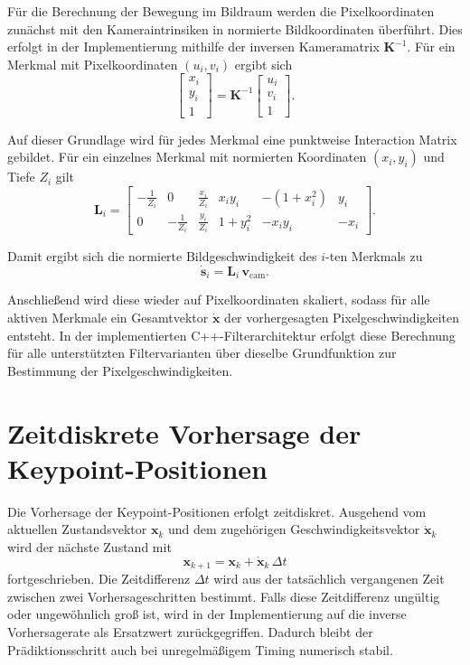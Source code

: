 Für die Berechnung der Bewegung im Bildraum werden die Pixelkoordinaten zunächst mit den Kameraintrinsiken in normierte Bildkoordinaten überführt. Dies erfolgt in der Implementierung mithilfe der inversen Kameramatrix \(\mathbf{K}^{-1}\). Für ein Merkmal mit Pixelkoordinaten \((u_i,v_i)\) ergibt sich
\begin{equation}
\begin{bmatrix}
x_i \\ y_i \\ 1
\end{bmatrix}
=
\mathbf{K}^{-1}
\begin{bmatrix}
u_i \\ v_i \\ 1
\end{bmatrix}.
\end{equation}

Auf dieser Grundlage wird für jedes Merkmal eine punktweise Interaction Matrix gebildet. Für ein einzelnes Merkmal mit normierten Koordinaten \((x_i,y_i)\) und Tiefe \(Z_i\) gilt
\begin{equation}
\mathbf{L}_i =
\begin{bmatrix}
-\frac{1}{Z_i} & 0 & \frac{x_i}{Z_i} & x_i y_i & -(1+x_i^2) & y_i \\
0 & -\frac{1}{Z_i} & \frac{y_i}{Z_i} & 1+y_i^2 & -x_i y_i & -x_i
\end{bmatrix}.
\end{equation}

Damit ergibt sich die normierte Bildgeschwindigkeit des \(i\)-ten Merkmals zu
\begin{equation}
\dot{\mathbf{s}}_i = \mathbf{L}_i \, \mathbf{v}_{\mathrm{cam}}.
\end{equation}

Anschließend wird diese wieder auf Pixelkoordinaten skaliert, sodass für alle aktiven Merkmale ein Gesamtvektor \(\dot{\mathbf{x}}\) der vorhergesagten Pixelgeschwindigkeiten entsteht. In der implementierten C++-Filterarchitektur erfolgt diese Berechnung für alle unterstützten Filtervarianten über dieselbe Grundfunktion zur Bestimmung der Pixelgeschwindigkeiten.

\section{Zeitdiskrete Vorhersage der Keypoint-Positionen}
\label{sec:zeitdiskrete_vorhersage_keypoint_positionen}

Die Vorhersage der Keypoint-Positionen erfolgt zeitdiskret. Ausgehend vom aktuellen Zustandsvektor \(\mathbf{x}_k\) und dem zugehörigen Geschwindigkeitsvektor \(\dot{\mathbf{x}}_k\) wird der nächste Zustand mit
\begin{equation}
\mathbf{x}_{k+1} = \mathbf{x}_k + \dot{\mathbf{x}}_k \, \Delta t
\end{equation}
fortgeschrieben. Die Zeitdifferenz \(\Delta t\) wird aus der tatsächlich vergangenen Zeit zwischen zwei Vorhersageschritten bestimmt. Falls diese Zeitdifferenz ungültig oder ungewöhnlich groß ist, wird in der Implementierung auf die inverse Vorhersagerate als Ersatzwert zurückgegriffen. Dadurch bleibt der Prädiktionsschritt auch bei unregelmäßigem Timing numerisch stabil.

